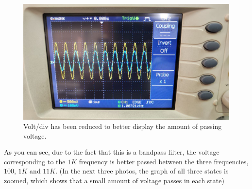 \documentclass[11pt]{article}
\begin{document}
\begin{question}
\begin{subquestion}
{\begin{figure}[H]
                \includegraphics[scale=0.1,angle=0]{Fig/21.jpeg}
                \caption{Volt/div has been reduced to better display the amount of passing voltage.}
            \end{figure}
            As you can see, due to the fact that this is a bandpass filter, the voltage corresponding to the $1K$ frequency is better passed between the three frequencies, $100$, $1K$ and $11K$. (In the next three photos, the graph of all three states is zoomed, which shows that a small amount of voltage passes in each state)
        }
    \end{subquestion}


\end{question}
\end{document}
